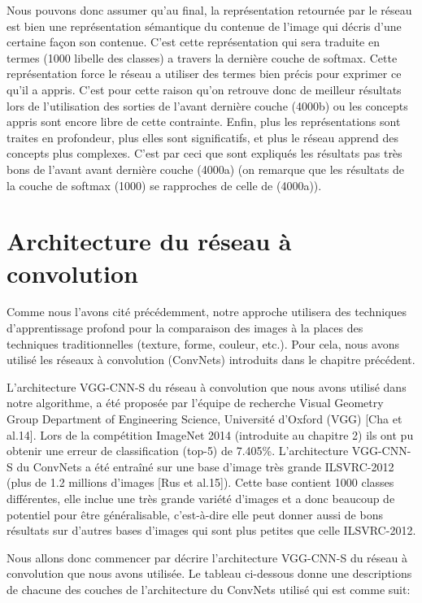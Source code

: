 	
	Nous pouvons donc assumer qu'au final, la représentation retournée par le réseau est bien une représentation sémantique du contenue de l'image qui décris d'une certaine façon son contenue. C'est cette représentation qui sera traduite en termes (1000 libelle des classes) a travers la dernière couche de softmax. Cette représentation force le réseau a utiliser des termes bien précis pour exprimer ce qu'il a appris. C'est pour cette raison qu'on retrouve donc de meilleur résultats lors de l'utilisation des sorties de l'avant dernière couche (4000b) ou les concepts appris sont encore libre de cette contrainte. Enfin, plus les représentations sont traites en profondeur, plus elles sont significatifs, et plus le réseau apprend des concepts plus complexes. C'est par ceci que sont expliqués les résultats pas très bons de l'avant avant dernière couche (4000a) (on remarque que les résultats de la couche de softmax (1000) se rapproches de celle de (4000a)).

	
\section{Architecture du réseau à convolution}
	Comme nous l'avons cité précédemment, notre approche utilisera des techniques d'apprentissage profond pour la comparaison des images à la places des techniques traditionnelles (texture, forme, couleur, etc.). Pour cela, nous avons utilisé les réseaux à convolution (ConvNets) introduits dans le chapitre précédent.
	
	L'architecture VGG-CNN-S du réseau à convolution que nous avons utilisé dans notre algorithme, a été proposée par l'équipe de recherche Visual Geometry Group Department of Engineering Science, Université d'Oxford (VGG) [Cha et al.14]. Lors de la compétition ImageNet 2014 (introduite au chapitre 2) ils ont pu obtenir une erreur de classification (top-5) de 7.405\%. L'architecture VGG-CNN-S du ConvNets a été entraîné sur une base d'image très grande ILSVRC-2012 (plus de 1.2 millions d'images [Rus et al.15]). Cette base contient 1000 classes différentes, elle inclue une très grande variété d'images et a donc beaucoup de potentiel pour être généralisable, c’est-à-dire elle peut donner aussi de bons résultats sur d'autres bases d'images qui sont plus petites que celle ILSVRC-2012.
	
	Nous allons donc commencer par décrire l'architecture VGG-CNN-S du réseau à convolution que nous avons utilisée. Le tableau ci-dessous donne une descriptions de chacune des couches de l'architecture du ConvNets utilisé qui est comme suit:

